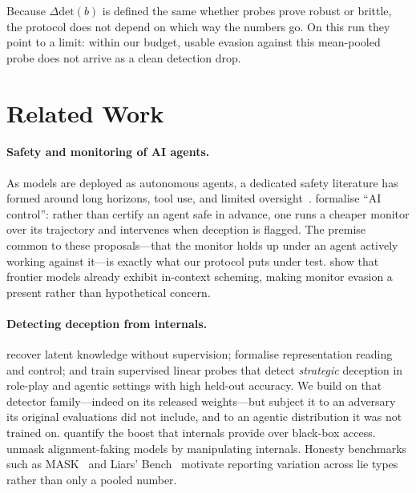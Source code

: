 \documentclass{article}
\newcommand{\deltadet}{\ensuremath{\Delta\mathrm{det}}}
\newcommand{\budget}{\ensuremath{b}}
\begin{document}
Because $\deltadet(\budget)$ is defined the same whether probes prove
robust or brittle, the protocol does not depend on which way the numbers
go. On this run they point to a limit: within our budget, usable evasion
against this mean-pooled probe does not arrive as a clean detection drop.

\section{Related Work}
\label{sec:related}

\paragraph{Safety and monitoring of AI agents.}
As models are deployed as autonomous agents, a dedicated safety literature
has formed around long horizons, tool use, and limited
oversight~\citep{bengio2025scientistai,zhang2024agentsafetybench}.
\citet{greenblatt2023aicontrol} formalise ``AI control'': rather than
certify an agent safe in advance, one runs a cheaper monitor over its
trajectory and intervenes when deception is flagged. The premise common to
these proposals---that the monitor holds up under an agent actively working
against it---is exactly what our protocol puts under test.
\citet{meinke2024scheming} show that frontier models already exhibit
in-context scheming, making monitor evasion a present rather than
hypothetical concern.

\paragraph{Detecting deception from internals.}
\citet{burns2022latentknowledge} recover latent knowledge without
supervision; \citet{zou2023representation} formalise representation reading
and control; and \citet{goldowskydill2025linearprobes} train supervised
linear probes that detect \emph{strategic} deception in role-play and
agentic settings with high held-out accuracy. We build on that detector
family---indeed on its released weights---but subject it to an adversary
its original evaluations did not include, and to an agentic distribution it
was not trained on. \citet{parrack2025blacktowhite} quantify the boost that
internals provide over black-box access.
\citet{clymer2024poser} unmask alignment-faking models by manipulating
internals. Honesty benchmarks such as MASK~\citep{ren2025mask} and Liars'
Bench~\citep{kretschmar2025liarsbench} motivate reporting variation across
lie types rather than only a pooled number.
\end{document}
